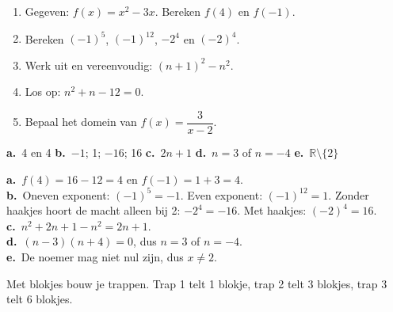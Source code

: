 \begin{oefeningen}[Start]
\begin{oefening}
\begin{enumerate}
  \item Gegeven: $f(x) = x^2 - 3x$. Bereken $f(4)$ en $f(-1)$.
  \item Bereken $(-1)^5$, $(-1)^{12}$, $-2^4$ en $(-2)^4$.
  \item Werk uit en vereenvoudig: $(n+1)^2 - n^2$.
  \item Los op: $n^2 + n - 12 = 0$.
  \item Bepaal het domein van $f(x) = \dfrac{3}{x-2}$.
\end{enumerate}
\begin{solution}
\textbf{a.}~4 en 4 \quad \textbf{b.}~$-1$; 1; $-16$; 16 \quad \textbf{c.}~$2n+1$ \quad \textbf{d.}~$n=3$ of $n=-4$ \quad \textbf{e.}~$\mathbb{R}\setminus\{2\}$
\end{solution}
\begin{fullsolution}
\textbf{a.}~$f(4)=16-12=4$ en $f(-1)=1+3=4$.\\
\textbf{b.}~Oneven exponent: $(-1)^5=-1$. Even exponent: $(-1)^{12}=1$. Zonder haakjes hoort de macht alleen bij 2: $-2^4=-16$. Met haakjes: $(-2)^4=16$.\\
\textbf{c.}~$n^2+2n+1-n^2=2n+1$.\\
\textbf{d.}~$(n-3)(n+4)=0$, dus $n=3$ of $n=-4$.\\
\textbf{e.}~De noemer mag niet nul zijn, dus $x\neq 2$.
\end{fullsolution}
\end{oefening}

\begin{oefening}\label{oef:h1-verken}
\quad Met blokjes bouw je trappen. Trap 1 telt 1 blokje, trap 2 telt 3 blokjes, trap 3 telt 6 blokjes.


\end{oefening}
\end{oefeningen}
